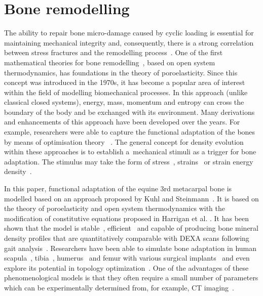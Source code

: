 \documentclass[11pt]{acmeArticle}
\numberwithin{equation}{section}
\begin{document}
\section{Bone remodelling} 
\label{sec:bone_remodel}
The ability to repair bone micro-damage caused by cyclic loading is essential for maintaining mechanical integrity and, consequently, there is a strong correlation between stress fractures and the remodelling process~\citep{hughes2017role}. One of the first mathematical theories for bone remodelling~\citep{cowin1976bone}, based on open system thermodynamics, has foundations in the theory of poroelasticity. 
Since this concept was introduced in the 1970s, it has become a popular area of interest within the field of modelling biomechanical processes. 
In this approach (unlike classical closed systems), energy, mass, momentum and entropy can cross the boundary of the body and 
be exchanged with its environment. 
Many derivations and enhancements of this approach have been developed over the years. 
For example, researchers were able to capture the functional adaptation of the bones by means of optimisation theory
~\citep{harrigan1996bone, jacobs1995numerical, weinans1992behavior}.
The general concept for density evolution within these approaches is to establish a~mechanical stimuli as a trigger for bone adaptation. 
The stimulus may take the form of stress~\citep{beaupre1990approach, carter1996mechanical, doblare2002anisotropic}, strains~\citep{cowin1976bone} or strain energy density~\citep{weinans1992behavior, kuhl2003theory,kaczmarczyk2011efficient, Connor2017bone}. 
 
In this paper, functional adaptation of the equine 3rd metacarpal bone is modelled based on an approach proposed by Kuhl and Steinmann~\citep{kuhl2003theory}. 
It is based on the theory of poroelasticity and open system thermodynamics with the modification of constitutive equations proposed in Harrigan et al. 
\citep{harrigan1996bone}. 
It has been shown that the model is stable~\citep{kuhl2003computational}, efficient~\citep{kaczmarczyk2011efficient} and capable of 
producing bone mineral density profiles that are quantitatively comparable with DEXA scans following gait analysis~\citep{pang2012computational}. 
Researchers have been able to simulate bone adaptation in human scapula~\citep{liedtke2017computational}, 
tibia~\citep{pang2012computational}, humerus~\citep{taylor2009phenomenon} and femur with various surgical implants~\citep{ambrosi2011perspectives, Connor2017bone} 
and even explore its potential in topology optimization~\citep{waffenschmidt2012application}. 
One of the advantages of these phenomenological models is that they often require a small number of parameters which can be experimentally
determined from, for example, CT imaging~\citep{zadpoor2013open}.
\end{document}
